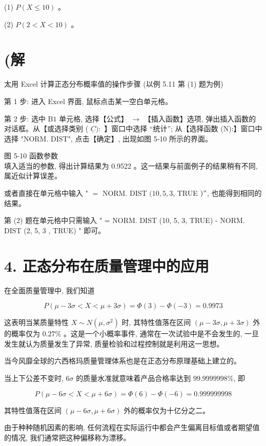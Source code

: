 \documentclass[10pt]{article}
\begin{document}
\begin{CJK*}{UTF8}{bsmi}
(1) $P(X \leqslant 10)$ 。

(2) $P(2<X<10)$ 。

\section*{(解}
太用 Excel 计算正态分布概率值的操作步骤 (以例 5.11 第 (1) 题为例)

第 1 步: 进入 Excel 界面, 鼠标点击某一空白单元格。

第 2 步: 选中 $\mathrm{B} 1$ 单元格, 选择【公式】 $\rightarrow$ 【插入函数】选项, 弹出插入函数的对话框。从【或选择类别 ( $\underline{C}):$ 】窗口中选择 “统计”; 从【选择函数 (N):】窗口中选择 "NORM. DIST", 点击【确定】, 出现如图 5-10 所示的界面。

\begin{center}
\end{center}

图 5-10 函数参数\\
填入适当的参数, 得出计算结果为 0.9522 。这一结果与前面例子的结果稍有不同, 属近似计算误差。

或者直接在单元格中输入 " $=$ NORM. DIST $(10,5,3$, TRUE $) "$, 也能得到相同的结果。

第 (2) 题在单元格中只需输入 " = NORM. DIST (10, 5, 3, TRUE) - NORM. DIST (2, 5, 3 , TRUE) " 即可。

\section*{4. 正态分布在质量管理中的应用}
在全面质量管理中, 我们知道

$$
P(\mu-3 \sigma<X<\mu+3 \sigma)=\Phi(3)-\Phi(-3)=0.9973
$$

这表明当某质量特性 $X \sim N\left(\mu, \sigma^{2}\right)$ 时, 其特性值落在区间 $(\mu-3 \sigma, \mu+3 \sigma)$ 外的概率仅为 $0.27 \%$ 。这是一个小概率事件, 通常在一次试验中是不会发生的, 一旦发生就认为质量发生了异常, 质量检验和过程控制就是利用这一思想。

当今风靡全球的六西格玛质量管理体系也是在正态分布原理基础上建立的。

当上下公差不变时, $6 \sigma$ 的质量水准就意味着产品合格率达到 $99.9999998 \%$, 即

$$
P(\mu-6 \sigma<X<\mu+6 \sigma)=\Phi(6)-\Phi(-6)=0.999999998
$$

其特性值落在区间 $(\mu-6 \sigma, \mu+6 \sigma)$ 外的概率仅为十亿分之二。

由于种种随机因素的影响, 任何流程在实际运行中都会产生偏离目标值或者期望值的情况, 我们通常把这种偏移称为漂移。


\end{CJK*}
\end{document}
